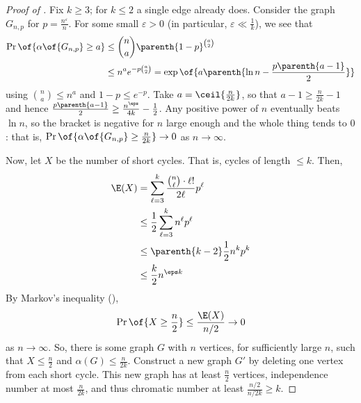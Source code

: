\begin{proof}[Proof of ]
    Fix $k \geq 3$; for $k \leq 2$ a single edge already does. Consider the graph $G_{n, p}$ for $p = \frac{n^{\varepsilon}}{n}$. For some small $\varepsilon > 0$ (in particular, $\varepsilon \ll \frac{1}{k}$), we see that
    \begin{align*}
        \Pr\of{\alpha\of{G_{n, p}} \geq a} &\leq \binom{n}{a} \parenth{1 - p}^{\binom{a}{2}}  \\
        & \leq n^a e^{-p \binom{a}{2}} = \exp\of{a \parenth{\ln n - \frac{p \parenth{a - 1}}{2}}}
    \end{align*}
    using $\binom{n}{a} \leq n^a$ and $1 - p \leq e^{-p}$. Take $a = \ceil{\frac{n}{2k}}$, so that $a - 1 \geq \frac{n}{2k} - 1$ and hence $\frac{p \parenth{a - 1}}{2} \geq \frac{n^{\eps}}{4k} - \frac{1}{2}$. Any positive power of $n$ eventually beats $\ln n$, so the bracket is negative for $n$ large enough and the whole thing tends to $0$: that is, $\Pr\of{\alpha\of{G_{n, p}} \geq \frac{n}{2k}} \to 0$ as $n \to \infty$.

    Now, let $X$ be the number of short cycles. That is, cycles of length $\leq k$. Then,
    \begin{align*}
        \E(X) &= \sum_{\ell = 3}^{k} \frac{\binom{n}{\ell} \cdot \ell !}{2\ell} p^{\ell} \\
        &\leq \frac{1}{2} \sum_{\ell = 3}^{k} n^{\ell} p^{\ell} \\
        &\leq \parenth{k - 2} \frac{1}{2} n^k p^k \\
        &\leq \frac{k}{2} n^{\eps k}
    \end{align*}
    By Markov's inequality (),
    \begin{align*}
        \Pr\of{X \geq \frac{n}{2}} \leq \frac{\E(X)}{n / 2} \to 0
    \end{align*}
    as $n \to \infty$. So, there is some graph $G$ with $n$ vertices, for sufficiently large $n$, such that $X \leq \frac{n}{2}$ and $\alpha(G) \leq \frac{n}{2k}$. Construct a new graph $G'$ by deleting one vertex from each short cycle. This new graph has at least $\frac{n}{2}$ vertices, independence number at most $\frac{n}{2k}$, and thus chromatic number at least $\frac{n/2}{n/2k} \geq k$.
\end{proof}
